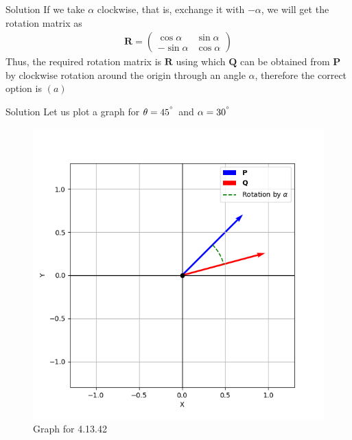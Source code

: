 \documentclass{beamer}
\let\vec\mathbf
\providecommand{\brak}[1]{\ensuremath{\left(#1\right)}}
\theoremstyle{remark}
\newcommand{\myvec}[1]{\ensuremath{\begin{pmatrix}#1\end{pmatrix}}}
\begin{document}
\begin{frame}{Solution}
If we take $\alpha$ clockwise, that is, exchange it with $-\alpha$, we will get the rotation matrix as 
\begin{align}
    \vec{R}=\myvec{\cos\alpha & \sin\alpha \\ -\sin{\alpha} & \cos\alpha}
\end{align}
Thus, the required rotation matrix is $\vec{R}$ using which $\vec{Q}$ can be obtained from $\vec{P}$ by clockwise rotation around the origin through an angle $\alpha $, therefore the correct option is $\brak{a}$\\   
\end{frame}
\begin{frame}{Solution}
 Let us plot a graph for $\theta=45^{\degree}$ and $\alpha=30^{\degree}$
\begin{figure}[H]
    \centering
    \includegraphics[width=0.5\columnwidth]{figs/1.png}
    \caption{Graph for 4.13.42}
    \label{fig:placeholder}
\end{figure}  
\end{frame}
\end{document}
